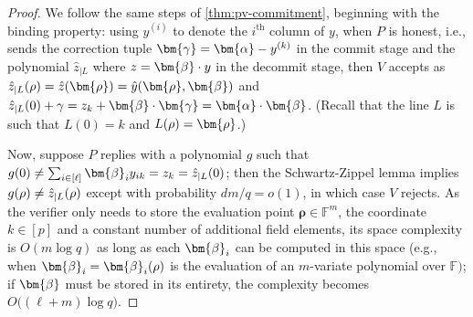\documentclass[a4paper,UKenglish,cleveref, autoref, thm-restate]{lipics-v2021}
\theoremstyle{definition}
\newcommand{\field}{\mathbb{F}}
\newcommand{\pcommitlength}{p}
\newcommand{\pcommitstring}{y}
\newcommand{\dimension}{m}
\newcommand{\degree}{d}
\newcommand{\fieldsize}{q}
\newcommand{\fingerprinttuple}{\bm{\rho}}
\renewcommand{\line}{L}
\def\fe#1{
    \ifnum#1=1
        \alpha
    \else
    \ifnum#1=2
        \beta
    \else
    \ifnum#1=3
        \gamma
    \fi\fi\fi
}
\def\rfe#1{
    \ifnum#1=1
        \rho
    \else
    \ifnum#1=2
        \sigma
    \else
    \fi\fi
}
\begin{document}
\begin{proof}
    We follow the same steps of \cref{thm:pv-commitment}, beginning with the binding property: using $\pcommitstring^{(i)}$ to denote the $i^\text{th}$ column of $\pcommitstring$, when $P$ is honest, i.e., sends the correction tuple $\bm{\fe3} = \bm{\fe1} - \pcommitstring^{(k)}$ in the \textsf{commit} stage and the polynomial $\hat z_{|\line}$ where $z = \bm{\fe2} \cdot \pcommitstring$ in the \textsf{decommit} stage, then $V$ accepts as $\hat z_{|\line}(\rfe1) = \hat z(\fingerprinttuple) = \hat \pcommitstring(\fingerprinttuple, \bm{\fe2})$ and $\hat z_{|\line}(0) + \fe3 = z_k + \bm{\fe2} \cdot \bm{\fe3} = \bm{\fe1} \cdot \bm{\fe2}$. (Recall that the line $\line$ is such that $\line(0) = k$ and $\line(\rfe1) = \fingerprinttuple$.)
    
    Now, suppose $P$ replies with a polynomial $g$ such that $g(0) \neq \sum_{i \in [\ell]} \bm{\fe2}_i
    \pcommitstring_{ik} = z_k = \hat z_{|\line}(0)$; then the Schwartz-Zippel lemma implies $g(\rfe1) \neq \hat z_{|\line}(\rfe1)$ except with probability $\degree \dimension / \fieldsize = o(1)$, in which case $V$ rejects. As the verifier only needs to store the evaluation point $\fingerprinttuple \in \field^\dimension$, the coordinate $k \in [\pcommitlength]$ and a constant number of additional field elements, its space complexity is $O(\dimension \log \fieldsize)$ as long as each $\bm{\fe2}_i$ can be computed in this space (e.g., when $\bm{\fe2}_i = \bm{\fe2}_i(\rfe1)$ is the evaluation of an $\dimension$-variate polynomial over $\field)$; if $\bm{\fe2}$ must be stored in its entirety, the complexity becomes $O\big((\ell + \dimension) \log \fieldsize\big)$.


\end{proof}
\end{document}
